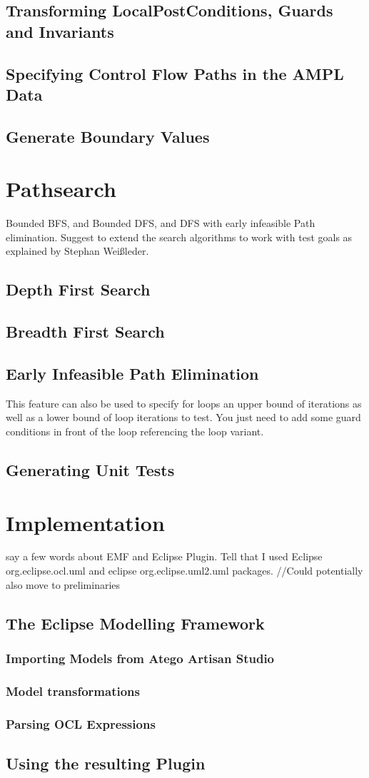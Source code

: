 \subsection{Transforming LocalPostConditions, Guards and Invariants}
\subsection{Specifying Control Flow Paths in the AMPL Data}
\subsection{Generate Boundary Values}
\section{Pathsearch}
Bounded BFS, and Bounded DFS, and DFS with early infeasible Path elimination.
Suggest to extend the search algorithms to work with test goals as explained by Stephan Weißleder.
\subsection{Depth First Search}
\subsection{Breadth First Search}
\subsection{Early Infeasible Path Elimination}
This feature can also be used to specify for loops an upper bound of iterations as well as a lower bound of loop iterations to test. You just need to add some guard conditions in front of the loop referencing the loop variant.
\subsection{Generating Unit Tests}
\label{sec:UnitTestGeneration}
\label{sec:UnitTestGen}
\section{Implementation}
say a few words about EMF and Eclipse Plugin. Tell that I used Eclipse org.eclipse.ocl.uml and eclipse org.eclipse.uml2.uml packages. //Could potentially also move to preliminaries
\subsection{The Eclipse Modelling Framework}
\cite{EMF}
\subsubsection{Importing Models from Atego Artisan Studio}
\subsubsection{Model transformations}
\subsubsection{Parsing OCL Expressions}
\subsection{Using the resulting Plugin}
